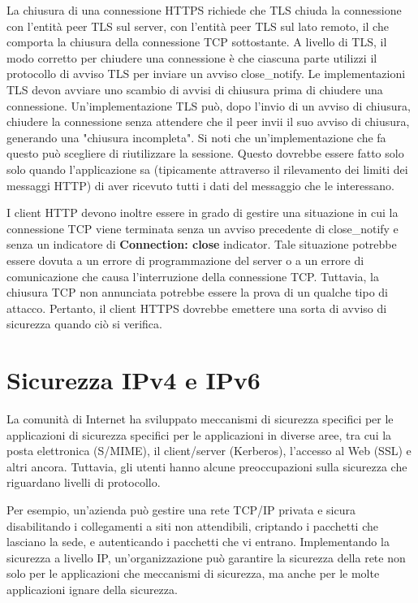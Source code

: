 \singlespacing

La chiusura di una connessione HTTPS richiede che TLS chiuda la connessione con l'entità peer TLS sul server, con l'entità peer TLS sul lato remoto, il che comporta la chiusura della connessione TCP sottostante.
A livello di TLS, il modo corretto per chiudere una connessione è che ciascuna parte utilizzi il protocollo di avviso TLS per inviare un avviso close\_notify. Le implementazioni TLS devon avviare uno scambio di avvisi di chiusura prima di chiudere una connessione.  Un'implementazione TLS può, dopo l'invio di un avviso di chiusura, chiudere la connessione senza attendere che il peer invii il suo avviso di chiusura, generando una "chiusura incompleta". Si noti che 
un'implementazione che fa questo può scegliere di riutilizzare la sessione. Questo dovrebbe essere fatto solo
solo quando l'applicazione sa (tipicamente attraverso il rilevamento dei limiti dei messaggi HTTP) di aver ricevuto tutti i dati del messaggio che le interessano.

\singlespacing

I client HTTP devono inoltre essere in grado di gestire una situazione in cui la connessione TCP viene terminata senza un avviso precedente di close\_notify e senza un indicatore di \textbf{Connection: close} indicator. Tale situazione potrebbe essere dovuta a un errore di programmazione del server o a un errore di comunicazione che causa l'interruzione della connessione TCP. Tuttavia, la chiusura TCP non annunciata potrebbe essere la prova di un qualche tipo di attacco.
Pertanto, il client HTTPS dovrebbe emettere una sorta di avviso di sicurezza quando ciò si verifica.

\section{Sicurezza IPv4 e IPv6 }
La comunità di Internet ha sviluppato meccanismi di sicurezza specifici per le applicazioni di sicurezza specifici per le applicazioni in diverse aree, tra cui la posta elettronica (S/MIME), il client/server (Kerberos), l'accesso al Web (SSL) e altri ancora.  Tuttavia, gli utenti hanno alcune preoccupazioni sulla sicurezza che riguardano livelli di protocollo. 

\singlespacing

Per esempio, un'azienda può gestire una rete TCP/IP privata e sicura disabilitando i collegamenti a siti non attendibili, criptando i pacchetti che lasciano la sede, e autenticando i pacchetti che vi entrano. Implementando la sicurezza a livello IP, un'organizzazione può garantire la sicurezza della rete non solo per le applicazioni che
meccanismi di sicurezza, ma anche per le molte applicazioni ignare della sicurezza.

